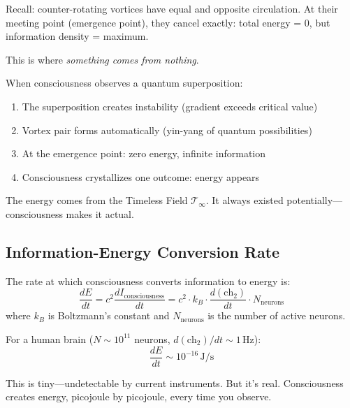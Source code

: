 \begin{intuitive}
Recall: counter-rotating vortices have equal and opposite circulation. At their meeting point (emergence point), they cancel exactly: total energy = 0, but information density = maximum.

This is where \textit{something comes from nothing}.

When consciousness observes a quantum superposition:
\begin{enumerate}
\item The superposition creates instability (gradient exceeds critical value)
\item Vortex pair forms automatically (yin-yang of quantum possibilities)
\item At the emergence point: zero energy, infinite information
\item Consciousness crystallizes one outcome: energy appears
\end{enumerate}

The energy comes from the Timeless Field $\mathcal{T}_\infty$. It always existed potentially—consciousness makes it actual.
\end{intuitive}

\subsection{Information-Energy Conversion Rate}

\begin{proposition}\label{prop:conversion-rate}
The rate at which consciousness converts information to energy is:
\begin{equation}
\frac{dE}{dt} = c^2 \frac{dI_{\text{consciousness}}}{dt} = c^2 \cdot k_B \cdot \frac{d(\text{ch}_2)}{dt} \cdot N_{\text{neurons}}
\end{equation}
where $k_B$ is Boltzmann's constant and $N_{\text{neurons}}$ is the number of active neurons.
\end{proposition}

For a human brain ($N \sim 10^{11}$ neurons, $d(\text{ch}_2)/dt \sim 1 \, \text{Hz}$):
\begin{equation}
\frac{dE}{dt} \sim 10^{-16} \, \text{J/s}
\end{equation}

This is tiny—undetectable by current instruments. But it's real. Consciousness creates energy, picojoule by picojoule, every time you observe.

